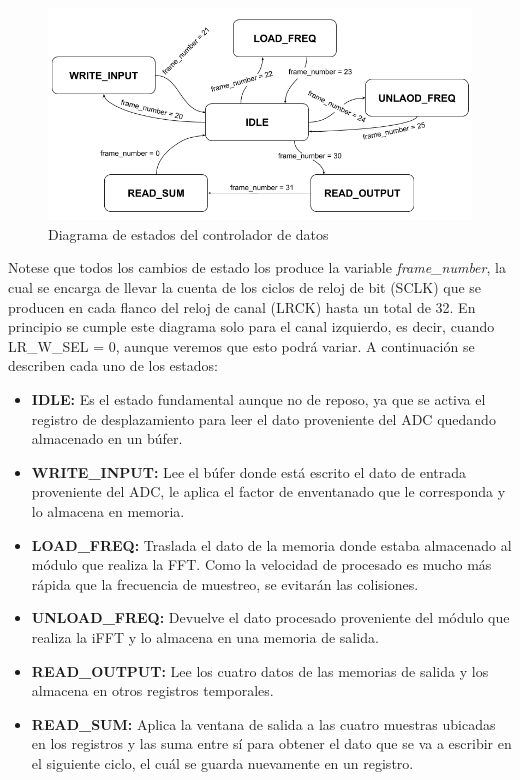 \begin{figure}[!th]
\begin{center}
\includegraphics[width=13cm]{img/destados.png}
\caption{\label{fig:estados}Diagrama de estados del controlador de datos}
\end{center}
\end{figure}

Notese que todos los cambios de estado los produce la variable \emph{frame\_number}, la cual se encarga de llevar la cuenta de los ciclos de reloj de bit (SCLK) que se producen en cada flanco del reloj de canal (LRCK) hasta un total de 32. En principio se cumple este diagrama solo para el canal izquierdo, es decir, cuando LR\_W\_SEL = 0, aunque veremos que esto podrá variar. A continuación se describen cada uno de los estados: 
\begin{itemize}
\item \textbf{IDLE:} Es el estado fundamental aunque no de reposo, ya que se activa el registro de desplazamiento para leer el dato proveniente del ADC quedando almacenado en un búfer.
\item \textbf{WRITE\_INPUT:} Lee el búfer donde está escrito el dato de entrada proveniente del ADC, le aplica el factor de enventanado que le corresponda y lo almacena en memoria.
\item \textbf{LOAD\_FREQ:} Traslada el dato de la memoria donde estaba almacenado al módulo que realiza la FFT. Como la velocidad de procesado es mucho más rápida que la frecuencia de muestreo, se evitarán las colisiones.
\item \textbf{UNLOAD\_FREQ:} Devuelve el dato procesado proveniente del módulo que realiza la iFFT y lo almacena en una memoria de salida.
\item \textbf{READ\_OUTPUT:} Lee los cuatro datos de las memorias de salida y los almacena en otros registros temporales.
\item \textbf{READ\_SUM:} Aplica la ventana de salida a las cuatro muestras ubicadas en los registros y las suma entre sí para obtener el dato que se va a escribir en el siguiente ciclo, el cuál se guarda nuevamente en un registro.
\end{itemize}

